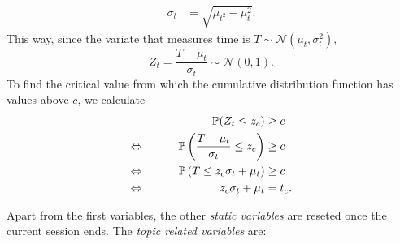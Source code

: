 \documentclass{article}
\newcommand{\0}{\mathbbold{0}}
\newcommand{\1}{\mathds{1}}
\newcommand{\2}{\mathbbold{2}}
\newcommand{\LRA}{\Leftrightarrow\mkern40mu}
\begin{document}
\begin{itemize}
\begin{align*}
        \sigma_t &= \sqrt{\mu_{t^2} - \mu_t^2}.
    \end{align*}
    This way, since the variate that measures time is $T \sim \mathcal{N}(\mu_t, \sigma^2_t)$,
    $$ Z_t = \frac{T-\mu_t}{\sigma_t} \sim \mathcal{N}(0,1). $$
    To find the critical value from which the cumulative distribution function has values above $c$, we calculate
    \begin{alignat*}{2}
        && \mathbb{P}(Z_t \le z_c) &\ge c \\
        \LRA && \mathbb{P}\left(\frac{T-\mu_t}{\sigma_t} \le z_c\right) &\ge c \\
        \LRA && \mathbb{P}\left(T \le z_c\sigma_t + \mu_t\right) &\ge c \\
        \LRA && z_c\sigma_t + \mu_t &= t_c.
    \end{alignat*}
\end{itemize}
Apart from the first variables, the other \textsl{static variables} are reseted once the current session ends. The \textsl{topic related variables} are:
\end{document}
